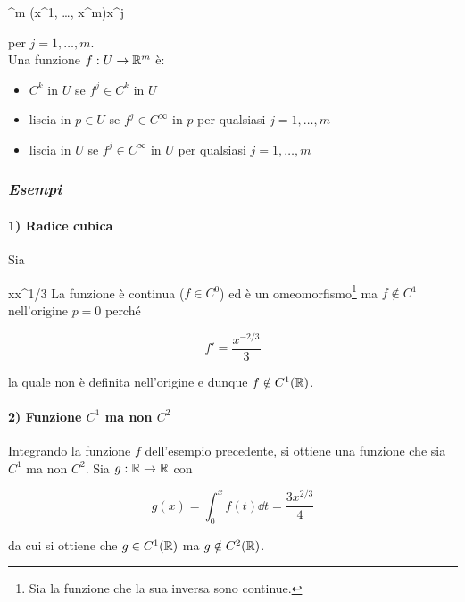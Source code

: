 	{\R^{m}}{\R}
	{(x^{1}, \dots, x^{m})}{x^{j}}
	
per $ j = 1, \dots, m $. \\
Una funzione $ f : U \to \mathbb{R}^{m} $ è:

\begin{itemize}
	\item $ C^{k} $ in $ U $ se $ f^{j} \in C^{k} $ in $ U $
	
	\item liscia in $ p \in U $ se $ f^{j} \in C^{\infty} $ in $ p $ per qualsiasi $ j = 1, \dots, m $
	
	\item liscia in $ U $ se $ f^{j} \in C^{\infty} $ in $ U $ per qualsiasi $ j = 1, \dots, m $
\end{itemize}

\subsubsection{\textit{Esempi}}

\paragraph{1) Radice cubica}

Sia

	{\R}{\R}
	{x}{x^{1/3}}
La funzione è continua ($ f \in C^{0} $) ed è un omeomorfismo\footnote{%
	Sia la funzione che la sua inversa sono continue.%
} ma $ f \notin C^{1} $ nell'origine $ p = 0 $ perché

\begin{equation}
	f' = \dfrac{x^{-2/3}}{3}
\end{equation}

la quale non è definita nell'origine e dunque $ f \notin C^{1} (\mathbb{R}) $.

\paragraph{2) Funzione $ C^{1} $ ma non $ C^{2} $}

Integrando la funzione $ f $ dell'esempio precedente, si ottiene una funzione che sia $ C^{1} $ ma non $ C^{2} $. Sia $ g : \mathbb{R} \to \mathbb{R} $ con

\begin{equation}
	g (x) = \int_{0}^{x} f (t) \dd{t} = \dfrac{3 x^{2/3}}{4}
\end{equation}

da cui si ottiene che $ g \in C^{1} (\mathbb{R}) $ ma $ g \notin C^{2} (\mathbb{R}) $.

